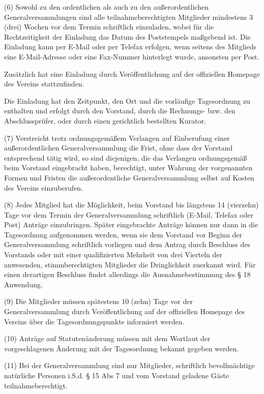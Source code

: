 \documentclass[11pt,a4paper]{article}
\begin{document}
(6)
Sowohl zu den ordentlichen als auch zu den außerordentlichen Generalversammlungen sind alle teilnahmeberechtigten Mitglieder mindestens 3 (drei) Wochen vor dem Termin schriftlich einzuladen, wobei für die Rechtzeitigkeit der Einladung das Datum des Poststempels maßgebend ist.
Die Einladung kann per E-Mail oder per Telefax erfolgen, wenn seitens des Mitglieds eine E-Mail-Adresse oder eine Fax-Nummer hinterlegt wurde, ansonsten per Post.

Zusätzlich hat eine Einladung durch Veröffentlichung auf der offiziellen Homepage des Vereins stattzufinden.

Die Einladung hat den Zeitpunkt, den Ort und die vorläufige Tagesordnung zu enthalten und erfolgt durch den Vorstand, durch die Rechnungs- bzw. den Abschlussprüfer, oder durch einen gerichtlich bestellten Kurator.

(7)
Verstreicht trotz ordnungsgemäßem Verlangen auf Einberufung einer außerordentlichen Generalversammlung die Frist, ohne dass der Vorstand entsprechend tätig wird, so sind diejenigen, die das Verlangen ordnungsgemäß beim Vorstand eingebracht haben, berechtigt, unter Wahrung der vorgenannten Formen und Fristen die außerordentliche Generalversammlung selbst auf Kosten des Vereins einzuberufen.

(8)
Jedes Mitglied hat die Möglichkeit, beim Vorstand bis längstens 14 (vierzehn) Tage vor dem Termin der Generalversammlung schriftlich (E-Mail, Telefax oder Post) Anträge einzubringen.
Später eingebrachte Anträge können nur dann in die Tagesordnung aufgenommen werden, wenn sie dem Vorstand vor Beginn der Generalversammlung schriftlich vorliegen und dem Antrag durch Beschluss des Vorstands oder mit einer qualifizierten Mehrheit von drei Vierteln der anwesenden, stimmberechtigten Mitglieder die Dringlichkeit zuerkannt wird.
Für einen derartigen Beschluss findet allerdings die Ausnahmebestimmung des § 18 Anwendung.

(9)
Die Mitglieder müssen spätestens 10 (zehn) Tage vor der Generalversammlung durch Veröffentlichung auf der offiziellen Homepage des Vereins über die Tagesordnungspunkte informiert werden.

(10)
Anträge auf Statutenänderung müssen mit dem Wortlaut der vorgeschlagenen Änderung mit der Tagesordnung bekannt gegeben werden.

(11)
Bei der Generalversammlung sind nur Mitglieder, schriftlich bevollmächtige natürliche Personen i.S.d. § 15 Abs 7 und vom Vorstand geladene Gäste teilnahmeberechtigt.
\end{document}
